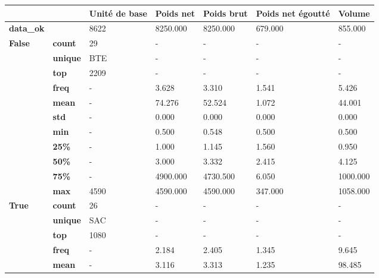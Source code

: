 \begin{tabularx}{\linewidth}{lXXXXXX}
\toprule
      &     & Unité de base &  Poids net &  Poids brut &  Poids net égoutté &    Volume \\
\midrule
\textbf{data\_ok} & {} &          8622 &   8250.000 &    8250.000 &            679.000 &   855.000 \\
\multirow{11}{*}{\textbf{False}} & \textbf{count} &            29 &          - &           - &                  - &         - \\
      & \textbf{unique} &           BTE &          - &           - &                  - &         - \\
      & \textbf{top} &          2209 &          - &           - &                  - &         - \\
      & \textbf{freq} &             - &      3.628 &       3.310 &              1.541 &     5.426 \\
      & \textbf{mean} &             - &     74.276 &      52.524 &              1.072 &    44.001 \\
      & \textbf{std} &             - &      0.000 &       0.000 &              0.000 &     0.000 \\
      & \textbf{min} &             - &      0.500 &       0.548 &              0.500 &     0.500 \\
      & \textbf{25\%} &             - &      1.000 &       1.145 &              1.560 &     0.950 \\
      & \textbf{50\%} &             - &      3.000 &       3.332 &              2.415 &     4.125 \\
      & \textbf{75\%} &             - &   4900.000 &    4730.500 &              6.050 &  1000.000 \\
      & \textbf{max} &          4590 &   4590.000 &    4590.000 &            347.000 &  1058.000 \\
\cline{1-7}
\multirow{10}{*}{\textbf{True }} & \textbf{count} &            26 &          - &           - &                  - &         - \\
      & \textbf{unique} &           SAC &          - &           - &                  - &         - \\
      & \textbf{top} &          1080 &          - &           - &                  - &         - \\
      & \textbf{freq} &             - &      2.184 &       2.405 &              1.345 &     9.645 \\
      & \textbf{mean} &             - &      3.116 &       3.313 &              1.235 &    98.485 \\

\end{tabularx}
